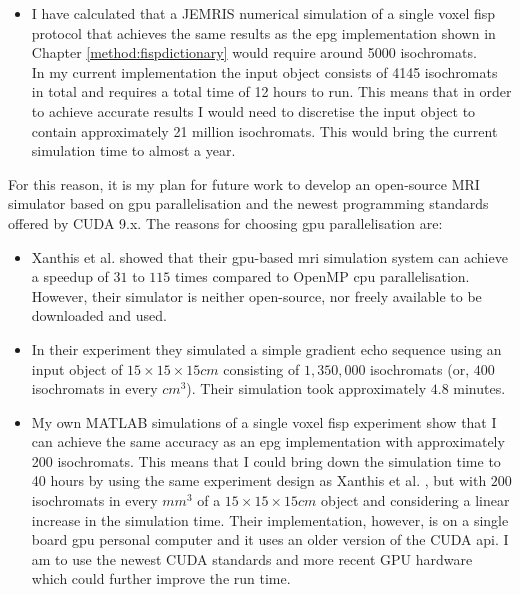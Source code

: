\begin{enumerate}
	\begin{itemize}
	    
	    \item I have calculated that a JEMRIS numerical simulation of a single voxel \ac{fisp} protocol that achieves the same results as the \ac{epg} implementation shown in Chapter \ref{method:fispdictionary} would require around 5000 isochromats. \\
	    
	    In my current implementation the input object consists of 4145 isochromats in total and requires a total time of 12 hours to run.
	    This means that in order to achieve accurate results I would need to discretise the input object to contain approximately 21 million isochromats.
	    This would bring the current simulation time to almost a year.
	    
	\end{itemize}
	
	For this reason, it is my plan for future work to develop an open-source MRI simulator based on \ac{gpu} parallelisation and the newest programming standards offered by CUDA 9.x.
	The reasons for choosing \ac{gpu} parallelisation are:
	
	\begin{itemize}
	    
	    \item Xanthis et al. \cite{Xanthis2014} showed that their \ac{gpu}-based \ac{mri} simulation system can achieve a speedup of $31$ to $115$ times compared to OpenMP \ac{cpu} parallelisation.
	    However, their simulator is neither open-source, nor freely available to be downloaded and used.
	    
	    \item In their experiment they simulated a simple gradient echo sequence using an input object of $15 \times 15 \times 15cm$ consisting of $1, 350, 000$ isochromats (or, $400$ isochromats in every $cm^3$).
	    Their simulation took approximately $4.8$ minutes.
	    
	    \item My own MATLAB simulations of a single voxel \ac{fisp} experiment show that I can achieve the same accuracy as an \ac{epg} implementation with approximately 200 isochromats.
	    This means that I could bring down the simulation time to 40 hours by using the same experiment design as Xanthis et al. \cite{Xanthis2014}, but with $200$ isochromats in every $mm^3$ of a $15 \times 15 \times 15cm$ object and considering a linear increase in the simulation time.
	    Their implementation, however, is on a single board \ac{gpu} personal computer and it uses an older version of the CUDA \ac{api}.
	    I am to use the newest CUDA standards and more recent GPU hardware which could further improve the run time.
	    

\end{itemize}
\end{enumerate}

